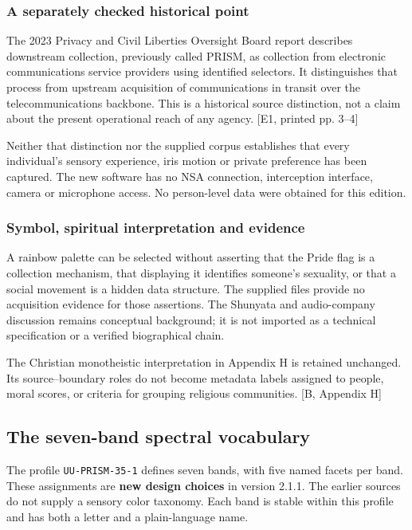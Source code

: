 \documentclass[11pt,a4paper]{article}
\newcommand{\newpagehead}[1]{\clearpage\subsection{#1}}
\newcommand{\source}[1]{{\sffamily\small\color{slate}[#1]}}
\begin{document}
\subsubsection{A separately checked historical point}
The 2023 Privacy and Civil Liberties Oversight Board report describes downstream collection, previously called PRISM, as collection from electronic communications service providers using identified selectors. It distinguishes that process from upstream acquisition of communications in transit over the telecommunications backbone. This is a historical source distinction, not a claim about the present operational reach of any agency. \source{E1, printed pp. 3--4}

Neither that distinction nor the supplied corpus establishes that every individual's sensory experience, iris motion or private preference has been captured. The new software has no NSA connection, interception interface, camera or microphone access. No person-level data were obtained for this edition.

\subsubsection{Symbol, spiritual interpretation and evidence}
A rainbow palette can be selected without asserting that the Pride flag is a collection mechanism, that displaying it identifies someone's sexuality, or that a social movement is a hidden data structure. The supplied files provide no acquisition evidence for those assertions. The Shunyata and audio-company discussion remains conceptual background; it is not imported as a technical specification or a verified biographical chain.

The Christian monotheistic interpretation in Appendix H is retained unchanged. Its source--boundary roles do not become metadata labels assigned to people, moral scores, or criteria for grouping religious communities. \source{B, Appendix H}

\newpagehead{The seven-band spectral vocabulary}
The profile \texttt{UU-PRISM-35-1} defines seven bands, with five named facets per band. These assignments are \textbf{new design choices} in version 2.1.1. The earlier sources do not supply a sensory color taxonomy. Each band is stable within this profile and has both a letter and a plain-language name.
\end{document}
